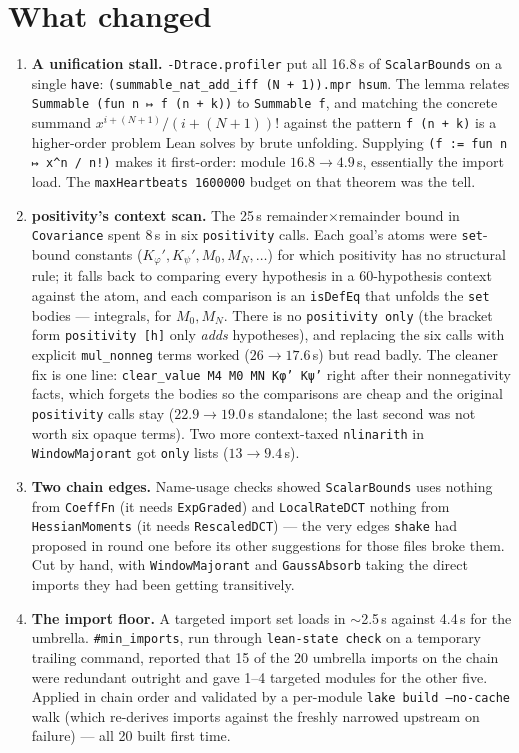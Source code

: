 \documentclass[11pt]{article}
\begin{document}
\section{What changed}

\begin{enumerate}[leftmargin=2em]
\item \textbf{A unification stall.} \texttt{-Dtrace.profiler} put all
16.8\,s of \texttt{ScalarBounds} on a single \texttt{have}:
\texttt{(summable\_nat\_add\_iff (N + 1)).mpr hsum}. The lemma
relates \texttt{Summable (fun n ↦ f (n + k))} to \texttt{Summable f},
and matching the concrete summand $x^{i+(N+1)}/(i+(N+1))!$ against the
pattern \texttt{f (n + k)} is a higher-order problem Lean solves by
brute unfolding. Supplying \texttt{(f := fun n ↦ x\^{}n / n!)} makes it
first-order: module $16.8 \to 4.9$\,s, essentially the import load. The
\texttt{maxHeartbeats 1600000} budget on that theorem was the tell.
\item \textbf{positivity's context scan.} The 25\,s
remainder$\times$remainder bound in \texttt{Covariance} spent 8\,s in
six \texttt{positivity} calls. Each goal's atoms were \texttt{set}-bound
constants ($K_\varphi', K_\psi', M_0, M_N, \dots$) for which positivity
has no structural rule; it falls back to comparing every hypothesis in a
60-hypothesis context against the atom, and each comparison is an
\texttt{isDefEq} that unfolds the \texttt{set} bodies --- integrals, for
$M_0, M_N$. There is no \texttt{positivity only} (the bracket form
\texttt{positivity [h]} only \emph{adds} hypotheses), and replacing the
six calls with explicit \texttt{mul\_nonneg} terms worked ($26 \to
17.6$\,s) but read badly. The cleaner fix is one line: \texttt{clear\_value
M4 M0 MN Kφ' Kψ'} right after their nonnegativity facts, which forgets
the bodies so the comparisons are cheap and the original
\texttt{positivity} calls stay ($22.9 \to 19.0$\,s standalone; the last
second was not worth six opaque terms). Two more context-taxed
\texttt{nlinarith} in \texttt{WindowMajorant} got \texttt{only} lists
($13 \to 9.4$\,s).
\item \textbf{Two chain edges.} Name-usage checks showed
\texttt{ScalarBounds} uses nothing from \texttt{CoeffFn} (it needs
\texttt{ExpGraded}) and \texttt{LocalRateDCT} nothing from
\texttt{HessianMoments} (it needs \texttt{RescaledDCT}) --- the very
edges \texttt{shake} had proposed in round one before its other
suggestions for those files broke them. Cut by hand, with
\texttt{WindowMajorant} and \texttt{GaussAbsorb} taking the direct
imports they had been getting transitively.
\item \textbf{The import floor.} A targeted import set loads in
$\sim$2.5\,s against 4.4\,s for the umbrella. \texttt{\#min\_imports},
run through \texttt{lean-state check} on a temporary trailing command,
reported that 15 of the 20 umbrella imports on the chain were redundant
outright and gave 1--4 targeted modules for the other five. Applied in
chain order and validated by a per-module \texttt{lake build --no-cache}
walk (which re-derives imports against the freshly narrowed upstream on
failure) --- all 20 built first time.
\end{enumerate}
\end{document}
